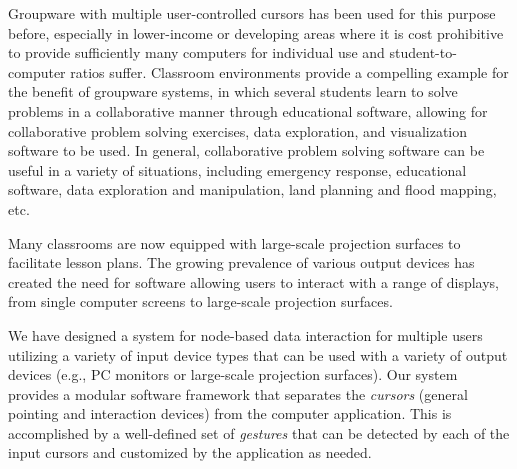 \documentclass[runningheads,a4paper]{llncs}
\begin{document}
Groupware with multiple user-controlled cursors has been used for this
purpose before, especially
in lower-income or developing areas
where it is cost prohibitive to provide sufficiently many computers for individual use
\cite{Pawar2006,Pawar2007} and student-to-computer ratios suffer.
Classroom environments provide a compelling example for the benefit of 
groupware systems, in which several students learn to
solve problems in a collaborative manner through educational software,
allowing for collaborative problem solving exercises, data exploration,
and visualization software to be used.
In general, collaborative problem solving software can be useful in a variety of situations,
including emergency response, educational software, data exploration and manipulation,
land planning and flood mapping, etc.

%
Many classrooms are now equipped with large-scale projection surfaces
to facilitate lesson plans.
The growing prevalence of 
various output devices
has created the need for software allowing users to interact with a range of
displays, from single computer screens to large-scale projection
surfaces. 

We have designed a system for node-based data interaction for multiple
users utilizing a variety of input device types
that can be used with a
variety of output devices (e.g., PC monitors or large-scale projection
surfaces).  Our system provides a modular
software framework that separates the {\em cursors} (general pointing
and interaction devices) from the computer application. This is
accomplished by a well-defined set of {\em gestures} that can be 
detected by each of the input cursors and customized by the
application as needed.
\end{document}
